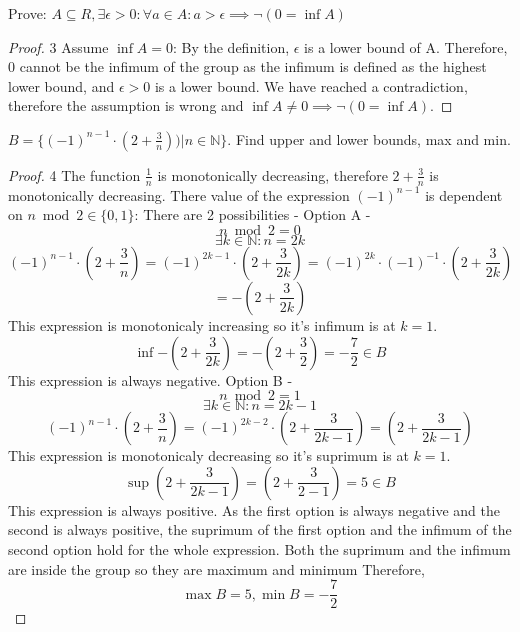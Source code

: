 \documentclass[12pt]{article}
\newenvironment{problem}[2][Problem]{\begin{trivlist}
\item[\hskip \labelsep {\bfseries #1}\hskip \labelsep {\bfseries #2.}]}{\end{trivlist}}
\begin{document}
\begin{problem}{3}
	Prove:
	$A \subseteq R, \exists \epsilon > 0: \forall a \in A: a > \epsilon \implies \lnot (0 = \inf A)$
\end{problem}

\begin{proof}{3}
	Assume $\inf A = 0$: \newline
	By the definition, $\epsilon$ is a lower bound of A. Therefore, 0 cannot be the infimum of the group as the infimum is defined as the highest lower bound, and $\epsilon > 0$ is a lower bound. \newline
	We have reached a contradiction, therefore the assumption is wrong and $\inf A \ne 0 \implies \lnot (0 = \inf A)$.
\end{proof}

\begin{problem}{4}
	$B = \{(-1)^{n-1}\cdot(2+\frac{3}{n})) | n \in \mathbb{N}\}$. Find upper and lower bounds, max and min.
\end{problem}

\begin{proof}{4}
	The function $\frac{1}{n}$ is monotonically decreasing, therefore $2+\frac{3}{n}$ is monotonically decreasing.
	There value of the expression $(-1)^{n-1}$ is dependent on $n \bmod{2} \in \{0,1\}$: \newline
	There are 2 possibilities - Option A - $$n \bmod{2} = 0$$
	$$\exists k \in \mathbb{N}: n = 2k$$
	$$(-1)^{n-1}\cdot(2+\frac{3}{n}) = (-1)^{2k-1}\cdot(2+\frac{3}{2k}) = (-1)^{2k}\cdot(-1)^{-1}\cdot(2+\frac{3}{2k})$$
	$$=-(2+\frac{3}{2k})$$
	This expression is monotonicaly increasing so it's infimum is at $k = 1$.
	$$\inf{-(2+\frac{3}{2k})}=-(2+\frac{3}{2})=-\frac{7}{2} \in B$$
	This expression is always negative. \newline
	Option B - $$n \bmod{2} = 1$$
	$$\exists k \in \mathbb{N}: n = 2k-1$$
	$$(-1)^{n-1}\cdot(2+\frac{3}{n}) = (-1)^{2k-2}\cdot(2+\frac{3}{2k-1}) = (2+\frac{3}{2k-1})$$
	This expression is monotonicaly decreasing so it's suprimum is at $k=1$.
	$$\sup{(2+\frac{3}{2k-1})} = (2+\frac{3}{2-1}) = 5 \in B$$
	This expression is always positive.
	As the first option is always negative and the second is always positive, the suprimum of the first option and the infimum of the second option hold for the whole expression. Both the suprimum and the infimum are inside the group so they are maximum and minimum
	Therefore, $$\max B = 5, \min B = -\frac{7}{2}$$
\end{proof}
\end{document}
